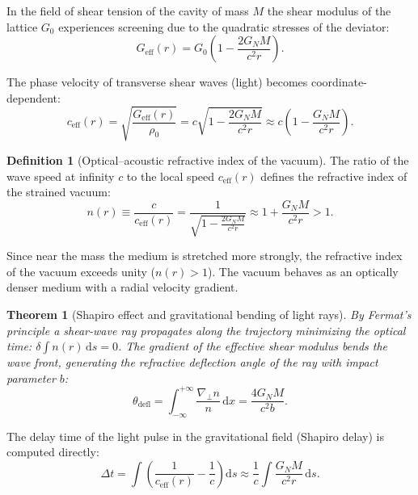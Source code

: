\documentclass[11pt,a4paper]{article}
\newtheorem{theorem}{Theorem}
\theoremstyle{definition}
\newtheorem{definition}{Definition}
\theoremstyle{remark}
\begin{document}
In the field of shear tension of the cavity of mass $M$ the shear modulus of the lattice $G_0$ experiences screening due to the quadratic stresses of the deviator:
\begin{equation}
G_{\mathrm{eff}}(r) = G_0 \left( 1 - \frac{2 G_N M}{c^2 r} \right).
\label{eq:G_eff_shear_screening}
\end{equation}

The phase velocity of transverse shear waves (light) becomes coordinate-dependent:
\begin{equation}
	c_{\mathrm{eff}}(r) = \sqrt{\frac{G_{\mathrm{eff}}(r)}{\rho_0}} = c \sqrt{1 - \frac{2 G_N M}{c^2 r}} \approx c \left( 1 - \frac{G_N M}{c^2 r} \right).
	\label{eq:variable_light_speed}
\end{equation}

\begin{definition}[Optical--acoustic refractive index of the vacuum]
	The ratio of the wave speed at infinity $c$ to the local speed $c_{\mathrm{eff}}(r)$ defines the refractive index of the strained vacuum:
	\begin{equation}
		n(r) \equiv \frac{c}{c_{\mathrm{eff}}(r)} = \frac{1}{\sqrt{1 - \frac{2 G_N M}{c^2 r}}} \approx 1 + \frac{G_N M}{c^2 r} > 1.
		\label{eq:refractive_index_exact}
	\end{equation}
\end{definition}

Since near the mass the medium is stretched more strongly, the refractive index of the vacuum exceeds unity ($n(r) > 1$). The vacuum behaves as an optically denser medium with a radial velocity gradient.

\begin{theorem}[Shapiro effect and gravitational bending of light rays]
	\label{thm:shapiro_deflection_exact}
	By Fermat's principle a shear-wave ray propagates along the trajectory minimizing the optical time: $\delta \int n(r) \, \mathrm{d}s = 0$. The gradient of the effective shear modulus bends the wave front, generating the refractive deflection angle of the ray with impact parameter $b$:
	\begin{equation}
		\theta_{\mathrm{defl}} = \int_{-\infty}^{+\infty} \frac{\nabla_\perp n}{n} \, \mathrm{d}x = \frac{4 G_N M}{c^2 b}.
		\label{eq:shapiro_deflection_formula}
	\end{equation}
\end{theorem}
The delay time of the light pulse in the gravitational field (Shapiro delay) is computed directly:
\begin{equation}
	\Delta t = \int \left( \frac{1}{c_{\mathrm{eff}}(r)} - \frac{1}{c} \right) \mathrm{d}s \approx \frac{1}{c} \int \frac{G_N M}{c^2 r} \, \mathrm{d}s.
	\label{eq:shapiro_time_delay}
\end{equation}
\end{document}
